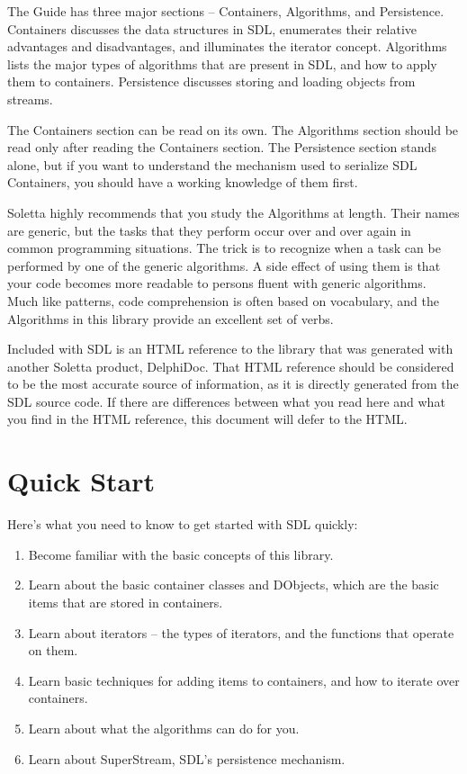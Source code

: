 \documentclass{report}
\begin{document}
The Guide has three major sections -- Containers, Algorithms, 
and Persistence. Containers
discusses the data structures in SDL, enumerates their relative 
advantages and
disadvantages, and illuminates the iterator concept. Algorithms 
lists the major types of
algorithms that are present in SDL, and how to apply them to 
containers. Persistence
discusses storing and loading objects from streams.

The Containers section can be read on its own. The Algorithms section should
be read only after reading the Containers section. The Persistence section
stands alone, but if you want to understand the mechanism used to serialize
SDL Containers, you should have a working knowledge of them first.

Soletta highly recommends that you study the Algorithms at length.  Their
names are generic, but the tasks that they perform occur over and over again
in common programming situations. The trick is to recognize when a task can
be performed by one of the generic algorithms. A side effect of using them
is that your code becomes more readable to persons fluent with generic
algorithms. Much like patterns, code comprehension is often based on
vocabulary, and the Algorithms in this library provide an excellent set of
verbs.

Included with SDL is an HTML reference to the library that was generated
with another Soletta product, DelphiDoc. That HTML reference should be
considered to be the most accurate source of information, as it is directly
generated from the SDL source code. If there are differences between what
you read here and what you find in the HTML reference,
this document will defer to the HTML.

\chapter{Quick Start}

Here's what you need to know to get started with SDL quickly:

\begin{enumerate}

\item Become familiar with the basic concepts of this library.

\item Learn about the basic container classes and DObjects, which 
are the basic items that are stored in containers.

\item Learn about iterators -- the types of iterators, and the functions 
that operate on them.

\item Learn basic techniques for adding items to containers, and 
how to iterate over containers.

\item Learn about what the algorithms can do for you.

\item Learn about SuperStream, SDL's persistence mechanism.
\end{enumerate}
\end{document}
